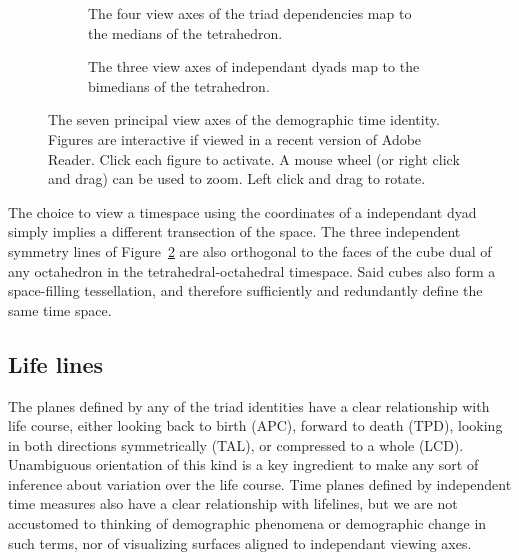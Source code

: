 \begin{figure}
\begin{subfigure}{.48\textwidth}

\caption{The four view axes of the triad dependencies map to the medians of the
tetrahedron.}
\label{fig:depviewaxes}
\end{subfigure}
\begin{subfigure}{.48\textwidth}

\caption{The three view axes of independant dyads map to the bimedians of the
tetrahedron.}
\label{fig:indepviewaxes}
\end{subfigure}
\caption{The seven principal view axes of the demographic time identity.
Figures are interactive if viewed in a recent version of Adobe Reader. Click
each figure to activate. A mouse wheel (or right click and drag) can be used to
zoom. Left click and drag to rotate.}
\label{fig:viewaxes}
\end{figure}

The choice to view a timespace using the coordinates of
a independant dyad simply implies a different transection of the space.
The three independent symmetry lines of Figure~\ref{fig:indepviewaxes} are
also orthogonal to the faces of the cube dual of any octahedron in the
tetrahedral-octahedral timespace. Said cubes also form a space-filling
tessellation, and therefore sufficiently and redundantly define the same time
space.

\subsection{Life lines}
The planes defined by any of the triad identities have a clear relationship with
life course, either looking back to birth (APC), forward to death (TPD),
looking in both directions symmetrically (TAL), or compressed to a whole (LCD).
Unambiguous orientation of this kind is a key ingredient to make any sort of
inference about variation over the life course. Time planes defined by
independent time measures also have a clear relationship with lifelines, but we
are not accustomed to thinking of demographic phenomena or demographic change in
such terms, nor of visualizing surfaces aligned to independant viewing axes.

